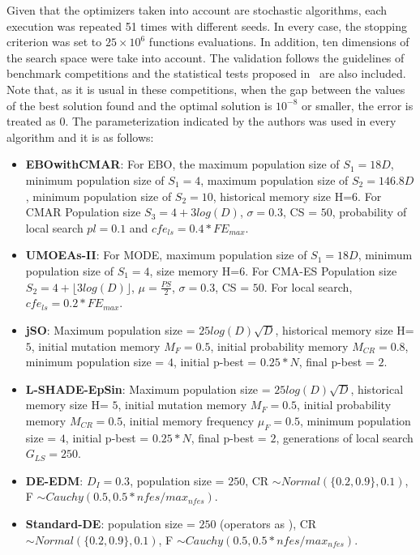 Given that the optimizers taken into account are stochastic algorithms, each execution was repeated 51 times with different seeds.
%
In every case, the stopping criterion was set to $25 \times 10^6$ functions evaluations.
%
In addition, ten dimensions of the search space were take into account.
%
The validation follows the guidelines of \CEC{} benchmark competitions and the statistical tests proposed in~\cite{Joel:StatisticalTest} are also included.
%
%
%
Note that, as it is usual in these competitions, when the gap between the values of the best solution found and the optimal solution is $10^{-8}$ or smaller, 
the error is treated as $0$.
%
%
The parameterization indicated by the authors was used in every algorithm and it is as follows:
\begin{itemize}
\item \textbf{EBOwithCMAR}: For EBO, the maximum population size of $S_1 = 18D$, minimum population size of $S_1 = 4$, maximum population size of $S_2 = 146.8D$, minimum population size of $S_2 = 10$, historical memory size H=$6$. For CMAR Population size $S_3 = 4 + 3log(D)$, $\sigma=0.3$, CS = $50$, probability of local search $pl = 0.1$ and $cfe_{ls} = 0.4* FE_{max}$.
\item \textbf{UMOEAs-II}: For MODE, maximum population size of $S_1 = 18D$, minimum population size of $S_1 = 4$, size memory H=$6$. For CMA-ES Population size $S_2 = 4 + \lfloor 3log(D) \rfloor$, $\mu=\frac{PS}{2}$, $\sigma=0.3$, CS = $50$. For local search, $cfe_{ls} = 0.2 * FE_{max}$.
\item \textbf{jSO}: Maximum population size = $25log(D)\sqrt{D}$, historical memory size H= $5$, initial mutation memory $M_F = 0.5$, initial probability memory $M_{CR} = 0.8$, minimum population size = $4$, initial p-best = $0.25*N$, final p-best = $2$.
\item \textbf{L-SHADE-EpSin}: Maximum population size = $25log(D)\sqrt{D}$, historical memory size H= $5$, initial mutation memory $M_F = 0.5$, initial probability memory $M_{CR} = 0.5$, initial memory frequency $\mu_F = 0.5$, minimum population size = $4$, initial p-best = $0.25*N$, final p-best = $2$, generations of local search $G_{LS}=250$.
\item \textbf{ DE-EDM}: $D_I = 0.3$, population size = $250$, CR $\sim Normal( \{0.2, 0.9\}, 0.1)$, F $\sim Cauchy(0.5, 0.5*nfes/max_{nfes})$.
\item \textbf{ Standard-DE}: population size = $250$ (operators as \DEEDM{}), CR $\sim Normal( \{0.2, 0.9\}, 0.1)$, F $\sim Cauchy(0.5, 0.5*nfes/max_{nfes})$.
\end{itemize}
%

